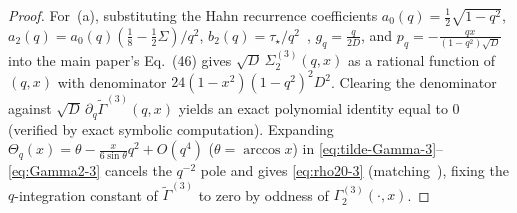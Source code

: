 \documentclass[11pt]{article}
\theoremstyle{definition}
\theoremstyle{remark}
\renewcommand{\_}{\oldunderscore\penalty0\hskip0pt\relax}
\begin{document}
\begin{proof}
For~(a), substituting the Hahn recurrence coefficients $a_0(q)=\frac12\sqrt{1-q^2}$, $a_2(q)=a_0(q)(\frac18-\frac12\Sigma)/q^2$,
  $b_2(q)=\tau_\star/q^2$~\cite[Eq.~(47)]{LewisGrowingRank}, $g_q=\frac{q}{2D}$, and $p_q=-\frac{qx}{(1-q^2)\sqrt{D}}$ into the main paper's
  Eq.~(46) gives $\sqrt{D}\,\Sigma_2^{(3)}(q,x)$ as a rational function of $(q,x)$ with
  denominator $24(1-x^2)(1-q^2)^2 D^2$. Clearing the denominator against $\sqrt{D}\,\partial_q\widetilde{\Gamma}^{(3)}(q,x)$
  yields an exact polynomial identity equal to $0$ (verified by exact symbolic computation).
  Expanding $\Theta_q(x)=\theta-\frac{x}{6\sin\theta}q^2+O(q^4)$ ($\theta=\arccos x$) in
  \eqref{eq:tilde-Gamma-3}--\eqref{eq:Gamma2-3} cancels the $q^{-2}$ pole and gives \eqref{eq:rho20-3} (matching~\cite[Corollary~F.1]{LewisGrowingRank}), fixing the $q$-integration constant of $\widetilde{\Gamma}^{(3)}$ to zero by
  oddness of $\Gamma_2^{(3)}(\cdot,x)$.


\end{proof}
\end{document}
